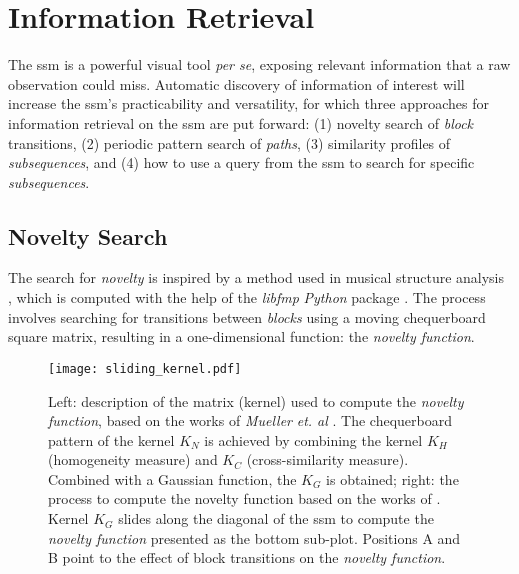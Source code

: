 \section{Information Retrieval}

The \gls{ssm} is a powerful visual tool \textit{per se}, exposing relevant information that a raw observation could miss. Automatic discovery of information of interest will increase the \gls{ssm}'s practicability and versatility, for which three approaches for information retrieval on the \gls{ssm} are put forward: (1) novelty search of \textit{block} transitions, (2) periodic pattern search of \textit{paths}, (3) similarity profiles of \textit{subsequences}, and (4) how to use a query from the \gls{ssm} to search for specific \textit{subsequences}. 


\subsection{Novelty Search}
\label{sec:novelty_search}

The search for \textit{novelty} is inspired by a method used in musical structure analysis \cite{foote2000}, which is computed with the help of the \textit{libfmp} \textit{Python} package \cite{libfmp}. The process involves searching for transitions between \textit{blocks} using a moving chequerboard square matrix, resulting in a one-dimensional function: the \textit{novelty function}.


\begin{figure}
    \centering
    \texttt{[image: sliding\_kernel.pdf]}
    \caption{Left: description of the matrix (kernel) used to compute the \textit{novelty function}, based on the works of \textit{Mueller} \textit{et. al} \cite{fmp1, fmp2}. The chequerboard pattern of the kernel $K_N$ is achieved by combining the kernel $K_H$ (homogeneity measure) and $K_C$ (cross-similarity measure). Combined with a Gaussian function, the $K_G$ is obtained; right: the process to compute the novelty function based on the works of \cite{Dannenberg2008,fmp1, fmp2}. Kernel $K_G$ slides along the diagonal of the \gls{ssm} to compute the \textit{novelty function} presented as the bottom sub-plot. Positions A and B point to the effect of block transitions on the \textit{novelty function}.}
    \label{fig:kernel_description}
\end{figure}


